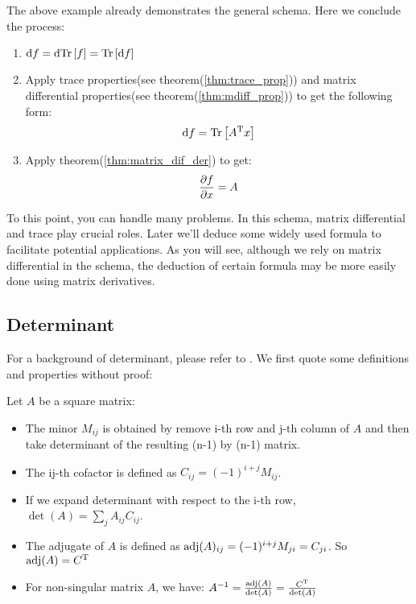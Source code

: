 The above example already demonstrates the general schema. 
Here we conclude the process:
\begin{enumerate}
	\item $\mathrm{d}f = \mathrm{d}\mathrm{Tr}\left[f\right] =\mathrm{Tr}\left[\mathrm{d}f\right] $
	\item Apply trace properties(see theorem(\ref{thm:trace_prop}))
	and matrix differential properties(see theorem(\ref{thm:mdiff_prop}))
	to get the following form:
		\begin{equation}
			\mathrm{d}f = \mathrm{Tr}\left[A^\mathrm{T}x\right]
		\end{equation}
	\item Apply theorem(\ref{thm:matrix_dif_der}) to get:
		\begin{equation}
			\dfrac{\partial f}{\partial x} = A
		\end{equation}
\end{enumerate}

To this point, you can handle many problems. In this schema, 
matrix differential and trace play crucial roles. Later we'll 
deduce some widely used formula to facilitate potential 
applications. As you will see, although we rely on matrix differential 
in the schema, the deduction of certain formula may be more easily done 
using matrix derivatives. 

\subsection{Determinant}
\label{sec:det}

For a background of determinant, please refer to \cite{wiki_det}. 
We first quote some definitions and properties without proof:
\begin{mythm}
	Let $A$ be a square matrix:
	\begin{itemize}
		\item The minor $M_{ij}$ is obtained by remove 
		i-th row and j-th column of $A$ and then take determinant
		of the resulting (n-1) by (n-1) matrix. 
		\item The ij-th cofactor is defined as $C_{ij} = (-1)^{i+j}M_{ij}$. 
		\item If we expand determinant with respect to the i-th row, 
		$\det(A) = \sum_{j}{A_{ij}C_{ij}}$. 
		\item The adjugate of $A$ is defined as 
		$\mathrm{adj}(A)_{ij}=(-1)^{i+j}M_{ji}=C_{ji}$. So 
		$\mathrm{adj}(A) = C^\mathrm{T}$
		\item For non-singular matrix $A$, we have:
		$A^{-1} = \frac{\mathrm{adj}(A)}{\det(A)} = \frac{C^\mathrm{T}}{\det(A)}$
	\end{itemize}
\end{mythm}

